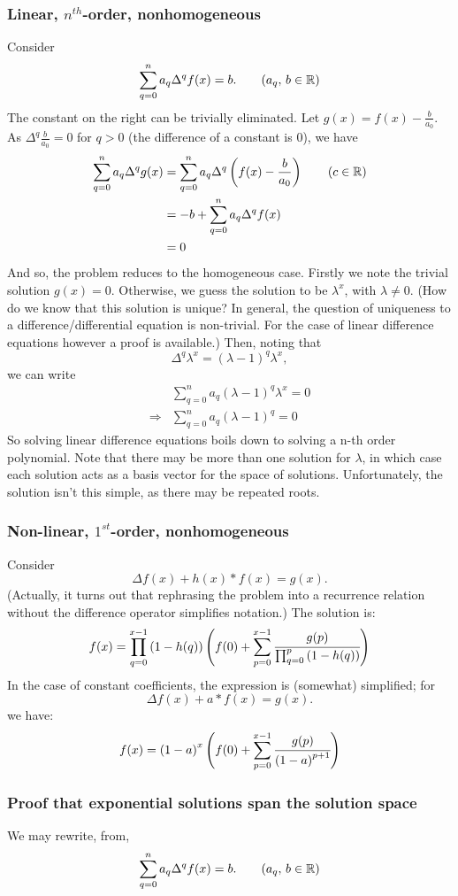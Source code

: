 \documentclass{article}
\renewcommand\({\left(}
\renewcommand\){\right)}
\begin{document}
\subsubsection{Linear, $n^{th}$-order, nonhomogeneous}
Consider 
\[\sum_{q=0}^na_q\Delta^qf(x)=b.\tag*{($a_q,\,b\in\mathbb{R}$)}\]
The constant on the right can be trivially eliminated. Let $g(x)=f(x)-\frac{b}{a_0}$. As $\Delta^q\frac{b}{a_0}=0$ for $q>0$ (the difference of a constant is 0), we have
\begin{align*}
    \sum_{q=0}^na_q\Delta^qg(x)&=\sum_{q=0}^na_q\Delta^q\left(f(x)-\frac{b}{a_0}\right)\tag*{($c\in\mathbb{R}$)}\\
    &=-b+\sum_{q=0}^na_q\Delta^qf(x)\\
    &=0
\end{align*}
And so, the problem reduces to the homogeneous case. Firstly we note the trivial solution $g(x)=0$. Otherwise, we guess the solution to be $\lambda^x$, with $\lambda\not=0$. (How do we know that this solution is unique? In general, the question of uniqueness to a difference/differential equation is non-trivial. For the case of linear difference equations however a proof is available.) Then, noting that 
\[\Delta^q\lambda^x=(\lambda-1)^q\lambda^x,\]
we can write
\begin{align*}
    &\sum_{q=0}^na_q(\lambda-1)^q\lambda^x=0\\
    \Rightarrow&\sum_{q=0}^na_q(\lambda-1)^q=0
\end{align*}
So solving linear difference equations boils down to solving a n-th order polynomial. Note that there may be more than one solution for $\lambda$, in which case each solution acts as a basis vector for the space of solutions.
Unfortunately, the solution isn't this simple, as there may be repeated roots. 
\subsubsection{Non-linear, $1^{st}$-order, nonhomogeneous}
Consider 
\[\Delta f(x)+h(x)*f(x)=g(x).\]
(Actually, it turns out that rephrasing the problem into a recurrence relation without the difference operator simplifies notation.)
The solution is:
\[f(x)=\prod_{q=0}^{x-1}\left(1-h(q)\right)\left(f(0)+\sum_{p=0}^{x-1}\cfrac{g(p)}{\prod_{q=0}^{p}\left(1-h(q)\right)}\right)\]
In the case of constant coefficients, the expression is (somewhat) simplified; for \[\Delta f(x)+a*f(x)=g(x).\] we have:
\[f(x)=\left(1-a\right)^x\left(f(0)+\sum_{p=0}^{x-1}\cfrac{g(p)}{\left(1-a\right)^{p+1}}\right)\]
\subsubsection{Proof that exponential solutions span the solution space}
We may rewrite, from,
\[\sum_{q=0}^na_q\Delta^qf(x)=b.\tag*{($a_q,\,b\in\mathbb{R}$)}\]
\end{document}
